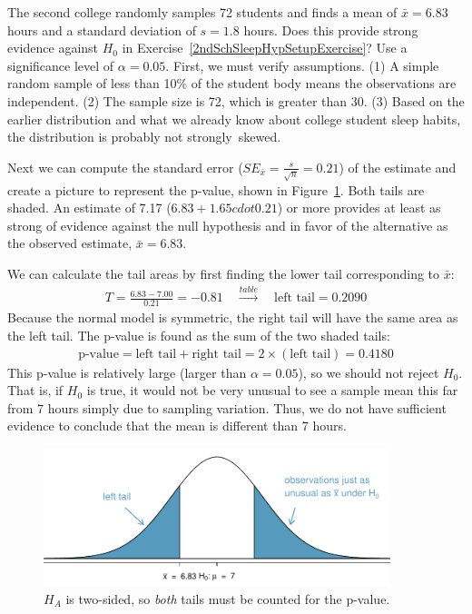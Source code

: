 \begin{example}{The second college randomly samples 72 students and finds a mean of $\bar{x} = 6.83$ hours and a standard deviation of $s=1.8$ hours. Does this provide strong evidence against $H_0$ in Exercise~\ref{2ndSchSleepHypSetupExercise}? Use a significance level of $\alpha=0.05$.}
First, we must verify assumptions. (1) A simple random sample of less than 10\% of the student body means the observations are independent. (2) The sample size is 72, which is greater than 30. (3) Based on the earlier distribution and what we already know about college student sleep habits, the distribution is probably not strongly~skewed.

Next we can compute the standard error ($SE_{\bar{x}} = \frac{s}{\sqrt{n}} = 0.21$) of the estimate and create a picture to represent the p-value, shown in Figure~\ref{2ndSchSleepHTExample}. Both tails are shaded. An estimate of 7.17 ($6.83 + 1.65 cdot 0.21$) or more provides at least as strong of evidence against the null hypothesis and in favor of the alternative as the observed estimate, $\bar{x} = 6.83$.

We can calculate the tail areas by first finding the lower tail corresponding to $\bar{x}$:
\begin{eqnarray*}
T = \frac{6.83 - 7.00}{0.21} = -0.81 \quad\stackrel{table}{\rightarrow}\quad \text{left tail}=0.2090
\end{eqnarray*}
Because the normal model is symmetric, the right tail will have the same area as the left tail. The p-value is found as the sum of the two shaded tails:
\begin{eqnarray*}
\text{p-value} = \text{left tail} + \text{right tail} = 2\times(\text{left tail}) = 0.4180
\end{eqnarray*}
This p-value is relatively large (larger than $\alpha=0.05$), so we should not reject $H_0$. That is, if $H_0$ is true, it would not be very unusual to see a sample mean this far from 7 hours simply due to sampling variation. Thus, we do not have sufficient evidence to conclude that the mean is different than 7 hours.


\begin{figure}
   \centering
   \includegraphics[width=0.9\textwidth]{ch_inference_foundations_oi_biostat/figures/2ndSchSleepHTExample/2ndSchSleepHTExample}
   \caption{$H_A$ is two-sided, so \emph{both} tails must be counted for the p-value.}
   \label{2ndSchSleepHTExample}
\end{figure}

\end{example}

